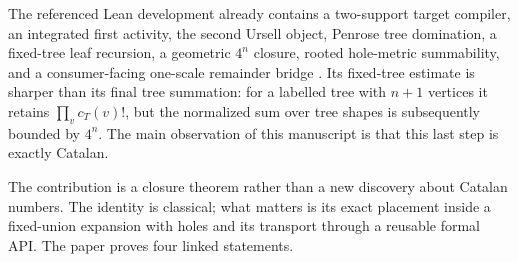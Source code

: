 \documentclass[11pt,a4paper]{article}
\theoremstyle{definition}
\newcommand{\Hsharp}{H^{\#}}
\newcommand{\Ksharp}{K^{\#}}
\begin{document}
The referenced Lean development already contains a two-support target compiler, an
integrated first activity, the second Ursell object, Penrose tree domination, a
fixed-tree leaf recursion, a geometric $4^n$ closure, rooted hole-metric summability, and
a consumer-facing one-scale remainder bridge \cite{ErikssonProgramme2026}.  Its
fixed-tree estimate is sharper than its final tree summation: for a labelled tree with
$n+1$ vertices it retains $\prod_v c_T(v)!$, but the normalized sum over tree shapes is
subsequently bounded by $4^n$.  The main observation of this manuscript is that this
last step is exactly Catalan.

\begin{pipelinebox}
\centering
{}
\end{pipelinebox}

The contribution is a closure theorem rather than a new discovery about Catalan
numbers.  The identity is classical; what matters is its exact placement inside a
fixed-union expansion with holes and its transport through a reusable formal API.  The
paper proves four linked statements.
\end{document}
